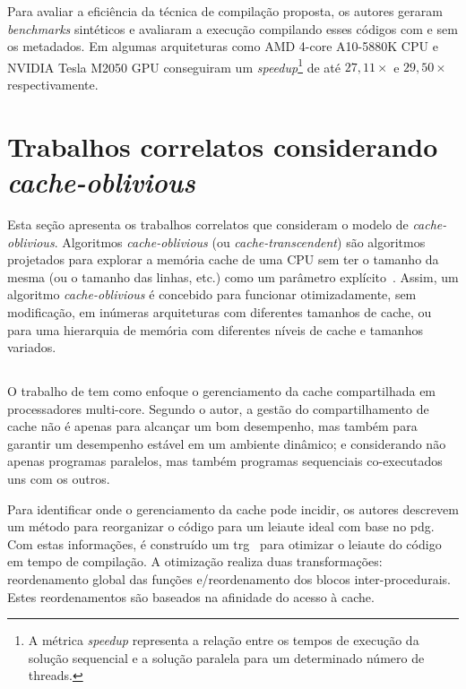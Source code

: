 Para avaliar a eficiência da técnica de compilação proposta, os autores geraram \textit{benchmarks} sintéticos e avaliaram a execução compilando esses códigos com e sem os metadados. Em algumas arquiteturas como AMD 4-core A10-5880K CPU e NVIDIA Tesla M2050 GPU conseguiram um \textit{speedup}\footnote{A métrica \textit{speedup} representa a relação entre os tempos de execução da solução sequencial e a solução paralela para um determinado número de threads.} de até $27,11 \times$ e $29,50 \times$ respectivamente.

\section{Trabalhos correlatos considerando \textit{cache-oblivious}}
\label{sec:trabalhos_cache_oblivous}

Esta seção apresenta os trabalhos correlatos que consideram o modelo de \textit{cache-oblivious}.
Algoritmos \textit{cache-oblivious} (ou \textit{cache-tran\-scen\-dent}) são algoritmos projetados para explorar a memória cache de uma CPU sem ter o tamanho da mesma (ou o tamanho das linhas, etc.) como um parâmetro explícito~\cite{frigo1999cache}. Assim, um algoritmo \textit{cache-oblivious} é concebido para funcionar otimizadamente, sem modificação, em inúmeras arquiteturas com diferentes tamanhos de cache, ou para uma hierarquia de memória com diferentes níveis de cache e tamanhos variados.

\subsection{}

O trabalho de  tem como enfoque o gerenciamento da cache compartilhada em processadores multi-core.
Segundo o autor, a gestão do compartilhamento de cache não é apenas para alcançar um bom desempenho, mas também para garantir um desempenho estável em um ambiente dinâmico; e considerando não apenas programas paralelos, mas também programas sequenciais co-executados uns com os outros.

Para identificar onde o gerenciamento da cache pode incidir, os autores descrevem um método para reorganizar o código para um leiaute ideal com base no \ac{pdg}.
Com estas informações, é construído um \ac{trg}~\cite{gloy1999procedure} para otimizar o leiaute do código em tempo de compilação.
A otimização realiza duas transformações: reordenamento global das funções e\@/\@ou reordenamento dos blocos inter-procedurais. Estes reordenamentos são baseados na afinidade do acesso à cache.

